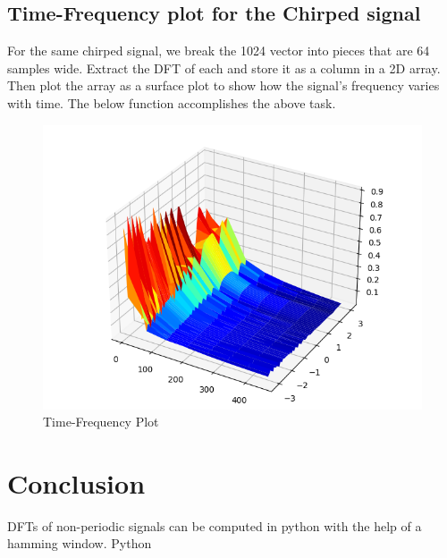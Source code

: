 \documentclass[12pt, a4paper]{report}
\begin{document}
\subsection{Time-Frequency plot for the Chirped signal}
For the same chirped signal,  we break the 1024 vector into pieces that are 64 samples wide. Extract the DFT of each and store it as a column in a 2D array. Then plot the array as a surface plot to show how the signal's frequency varies with time. The below function accomplishes the above task.
\noindent

\begin{figure}[h!]
    \centering
    \includegraphics[scale=0.7]{fig5.png} 
    \caption{Time-Frequency Plot}
    \label{fig:my_label}
\end{figure}
\section{Conclusion}
DFTs of non-periodic signals can be computed in python with the help of a hamming window. Python
\end{document}
